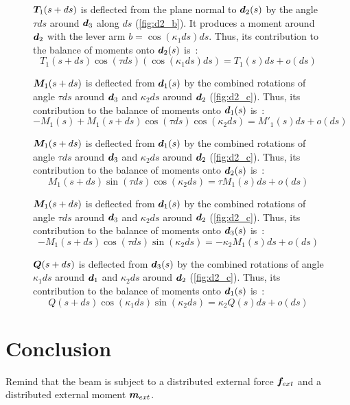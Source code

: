\begin{figure}[p]
\begin{fullpage}
		$\boldsymbol{T}_1(s+ds)$ is deflected from the plane normal to $\boldsymbol{d}_2(s)$ by the angle $\tau ds$ around $\boldsymbol{d}_3$ along $ds$ (\cref{fig:d2_b}). It produces a moment around $\boldsymbol{d}_2$ with the lever arm $b =  \cos(\kappa_1 ds) ds$. Thus, its contribution to the balance of moments onto $\boldsymbol{d}_2(s)$ is~: 
	\begin{equation*}
		T_1(s+ds) \cos(\tau ds) (\cos(\kappa_1 ds) ds) = T_1(s) ds + o(ds)
	\end{equation*}
	
	$\boldsymbol{M}_1(s+ds)$ is deflected from $\boldsymbol{d}_1(s)$ by the combined rotations of angle $\tau ds$ around $\boldsymbol{d}_3$ and $\kappa_2 ds$ around $\boldsymbol{d}_2$ (\cref{fig:d2_c}). Thus, its contribution to the balance of moments onto $\boldsymbol{d}_1(s)$ is~: 
	\begin{equation*}
		-M_1(s) + M_1(s+ds) \cos(\tau ds) \cos(\kappa_2 ds) = M'_1 (s) ds + o(ds)
	\end{equation*}	
	
	$\boldsymbol{M}_1(s+ds)$ is deflected from $\boldsymbol{d}_1(s)$ by the combined rotations of angle $\tau ds$ around $\boldsymbol{d}_3$ and $\kappa_2 ds$ around $\boldsymbol{d}_2$ (\cref{fig:d2_c}). Thus, its contribution to the balance of moments onto $\boldsymbol{d}_2(s)$ is~: 
	\begin{equation*}
		M_1(s+ds) \sin(\tau ds) \cos(\kappa_2 ds) = \tau M_1 (s) ds + o(ds)
	\end{equation*}	
	
	$\boldsymbol{M}_1(s+ds)$ is deflected from $\boldsymbol{d}_1(s)$ by the combined rotations of angle $\tau ds$ around $\boldsymbol{d}_3$ and $\kappa_2 ds$ around $\boldsymbol{d}_2$ (\cref{fig:d2_c}). Thus, its contribution to the balance of moments onto $\boldsymbol{d}_3(s)$ is~: 
	\begin{equation*}
		-M_1(s+ds) \cos(\tau ds) \sin(\kappa_2 ds) = -\kappa_2 M_1 (s) ds + o(ds)
	\end{equation*}	
	
	$\boldsymbol{Q}(s+ds)$ is deflected from $\boldsymbol{d}_3(s)$ by the combined rotations of angle $\kappa_1 ds$ around $\boldsymbol{d}_1$ and $\kappa_2 ds$ around $\boldsymbol{d}_2$ (\cref{fig:d2_c}). Thus, its contribution to the balance of moments onto $\boldsymbol{d}_1(s)$ is~: 
	\begin{equation*}
		Q(s+ds) \cos(\kappa_1 ds) \sin(\kappa_2 ds) = \kappa_2 Q(s) ds + o(ds)
	\end{equation*}	
	  \end{fullpage}
\end{figure}

\section{Conclusion}
Remind that the beam is subject to a distributed external force $\boldsymbol{f}_{ext}$ and a distributed external moment $\boldsymbol{m}_{ext}$.

